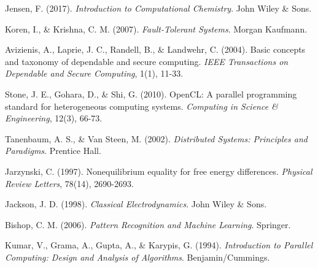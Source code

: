 \documentclass[12pt,a4paper]{article}
\begin{document}
\begin{thebibliography}{99}
Jensen, F. (2017). \textit{Introduction to Computational Chemistry}. John Wiley \& Sons.

Koren, I., \& Krishna, C. M. (2007). \textit{Fault-Tolerant Systems}. Morgan Kaufmann.

Avizienis, A., Laprie, J. C., Randell, B., \& Landwehr, C. (2004). Basic concepts and taxonomy of dependable and secure computing. \textit{IEEE Transactions on Dependable and Secure Computing}, 1(1), 11-33.

Stone, J. E., Gohara, D., \& Shi, G. (2010). OpenCL: A parallel programming standard for heterogeneous computing systems. \textit{Computing in Science \& Engineering}, 12(3), 66-73.

Tanenbaum, A. S., \& Van Steen, M. (2002). \textit{Distributed Systems: Principles and Paradigms}. Prentice Hall.

Jarzynski, C. (1997). Nonequilibrium equality for free energy differences. \textit{Physical Review Letters}, 78(14), 2690-2693.

Jackson, J. D. (1998). \textit{Classical Electrodynamics}. John Wiley \& Sons.

Bishop, C. M. (2006). \textit{Pattern Recognition and Machine Learning}. Springer.

Kumar, V., Grama, A., Gupta, A., \& Karypis, G. (1994). \textit{Introduction to Parallel Computing: Design and Analysis of Algorithms}. Benjamin/Cummings.

\end{thebibliography}
\end{document}

